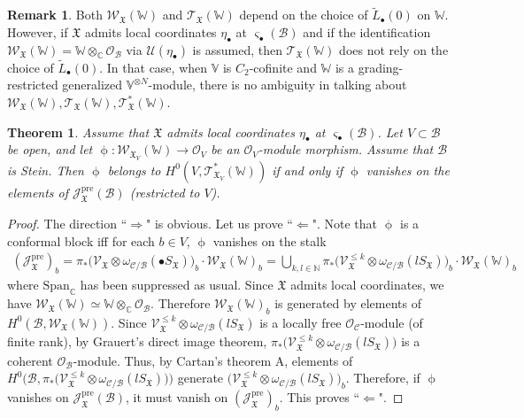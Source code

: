 \documentclass[11pt,b5paper,notitlepage]{article}
\theoremstyle{definition}
\newtheorem{rem}[df]{Remark}
\theoremstyle{plain}
\newtheorem{thm}[df]{Theorem}
\newcommand{\mc}{\mathcal}
\newcommand{\wtd}{\widetilde}
\newcommand{\SV}{\mathscr{V}}
\newcommand{\Span}{\mathrm{Span}}
\newcommand{\scr}{\mathscr}
\newcommand{\sgm}{\varsigma}
\newcommand{\blt}{\bullet}
\newcommand{\Vbb}{\mathbb V}
\newcommand{\Wbb}{\mathbb W}
\newcommand{\Cbb}{\mathbb C}
\newcommand{\Nbb}{\mathbb N}
\newcommand{\<}{\left\langle}
\renewcommand{\>}{\right\rangle}
\newcommand{\MC}{\mathcal{C}}
\newcommand{\MB}{\mathcal{B}}
\newcommand{\fx}{\mathfrak{X}}
\newcommand{\SJ}{\mathscr{J}}
\newcommand{\SW}{\mathscr{W}}
\newcommand{\pre}{\mathrm{pre}}
\numberwithin{equation}{section}
\begin{document}
\begin{rem}\label{lbb20}
Both $\scr W_\fx(\Wbb)$ and $\scr T_\fx(\Wbb)$ depend on the choice of $\wtd L_\blt(0)$ on $\Wbb$. However, if $\fx$ admits local coordinates $\eta_\blt$ at $\sgm_\blt(\MB)$ and if the identification $\scr W_\fx(\Wbb)=\Wbb\otimes_\Cbb\mc O_\MB$ via $\mc U(\eta_\blt)$ is assumed, then $\scr T_\fx(\Wbb)$ does not rely on the choice of $\wtd L_\blt(0)$. In that case, when $\Vbb$ is $C_2$-cofinite and $\Wbb$ is a grading-restricted generalized $\Vbb^{\otimes N}$-module, there is no ambiguity in talking about $\scr W_\fx(\Wbb),\scr T_\fx(\Wbb),\scr T^*_\fx(\Wbb)$.
\end{rem}


\begin{thm}\label{lbb28}
Assume that $\fx$ admits local coordinates $\eta_\blt$ at $\sgm_\blt(\MB)$. Let $V\subset\MB$ be open, and let $\upphi:\scr W_{\fx_V}(\Wbb)\rightarrow\mc O_V$ be an $\mc O_V$-module morphism. Assume that $\MB$ is Stein. Then $\upphi$ belongs to $H^0(V,\scr T_{\fx_V}^*(\Wbb))$ if and only if $\upphi$ vanishes on the elements of $\SJ^\pre_\fx(\MB)$ (restricted to $V$).
\end{thm}


\begin{proof}
The direction ``$\Rightarrow$" is obvious. Let us prove ``$\Leftarrow$". Note that $\upphi$ is a conformal block iff for each $b\in V$, $\upphi$ vanishes on the stalk
\begin{align*}
(\SJ^\pre_\fx)_b= \pi_*\big(\SV_{\fx}\otimes \omega_{\MC/\MB}(\blt S_\fx)\big)_b\cdot \SW_\fx(\Wbb)_b=\bigcup_{k,l\in\Nbb}\pi_*\big(\SV_{\fx}^{\leq k}\otimes \omega_{\MC/\MB}(l S_\fx)\big)_b\cdot \SW_\fx(\Wbb)_b
\end{align*}
where $\Span_\Cbb$ has been suppressed as usual. Since $\fx$ admits local coordinates, we have $\scr W_\fx(\Wbb)\simeq\Wbb\otimes_\Cbb\mc O_\MB$. Therefore $\scr W_\fx(\Wbb)_b$ is generated by elements of $H^0(\MB,\scr W_\fx(\Wbb))$. Since $\SV_{\fx}^{\leq k}\otimes \omega_{\MC/\MB}(l S_\fx)$ is a locally free $\mc O_\MC$-module (of finite rank), by Grauert's direct image theorem, $\pi_*\big(\SV_{\fx}^{\leq k}\otimes \omega_{\MC/\MB}(l S_\fx)\big)$ is a coherent $\mc O_\MB$-module. Thus, by Cartan's theorem A, elements of $H^0\big(\MB,\pi_*\big(\SV_{\fx}^{\leq k}\otimes \omega_{\MC/\MB}(l S_\fx)\big)\big)$ generate $\big(\SV_{\fx}^{\leq k}\otimes \omega_{\MC/\MB}(l S_\fx)\big)_b$. Therefore, if $\upphi$ vanishes on $\SJ_\fx^\pre(\MB)$, it must vanish on $(\SJ_\fx^\pre)_b$. This proves ``$\Leftarrow$".
\end{proof}
\end{document}
